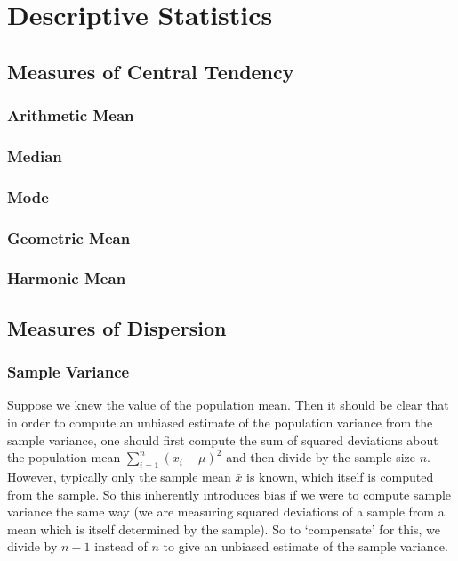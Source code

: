\documentclass[11pt]{report} %
\begin{document}
\section{Descriptive Statistics}

\subsection{Measures of Central Tendency}

\subsubsection{Arithmetic Mean}

\subsubsection{Median}

\subsubsection{Mode}

\subsubsection{Geometric Mean}

\subsubsection{Harmonic Mean}

\subsection{Measures of Dispersion}

\subsubsection{Sample Variance}

Suppose we knew the value of the population mean. Then it should be clear that in order to compute an unbiased estimate of the population variance from the sample variance, one should first compute the sum of squared deviations about the population mean $\sum_{i = 1}^{n}{\left(x_{i} - \mu\right)^{2}}$ and then divide by the sample size $n$. However, typically only the sample mean $\bar{x}$ is known, which itself is computed from the sample. So this inherently introduces bias if we were to compute sample variance the same way (we are measuring squared deviations of a sample from a mean which is itself determined by the sample). So to `compensate' for this, we divide by $n - 1$ instead of $n$ to give an unbiased estimate of the sample variance.
\end{document}
